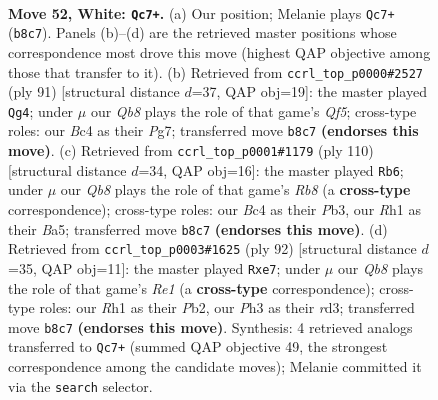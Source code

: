 \documentclass[11pt]{article}
\begin{document}
\clearpage

\begin{figure}[p]\centering
\begin{subfigure}{0.46\textwidth}\centering
\resizebox{\linewidth}{!}{%
\newchessgame
\chessboard[
  setfen={1Q3r2/1b2k3/8/8/2B5/7P/1p4P1/6KR w - - 13 52},
  showmover=false,
  pgfstyle=straightmove, color=movearrow, markmove={b8-c7}
]}
\caption{}
\end{subfigure}\hfill
\begin{subfigure}{0.46\textwidth}\centering
\resizebox{\linewidth}{!}{%
\newchessgame
\chessboard[
  setfen={2R5/4k1pp/5p2/3B4/5q1P/8/5R2/5K2 b - - 0 46},
  showmover=false,
  pgfstyle=straightmove, color=movearrow, markmove={f4-g4}
]}
\caption{}
\end{subfigure}
\\[4pt]
\begin{subfigure}{0.46\textwidth}\centering
\resizebox{\linewidth}{!}{%
\newchessgame
\chessboard[
  setfen={1R6/5k2/p1b2p2/B7/8/1P1r1P2/P5K1/8 w - - 3 56},
  showmover=false,
  pgfstyle=straightmove, color=movearrow, markmove={b8-b6}
]}
\caption{}
\end{subfigure}\hfill
\begin{subfigure}{0.46\textwidth}\centering
\resizebox{\linewidth}{!}{%
\newchessgame
\chessboard[
  setfen={6k1/4r3/p4p2/8/B5b1/P2r4/1P6/K3R3 w - - 0 47},
  showmover=false,
  pgfstyle=straightmove, color=movearrow, markmove={e1-e7}
]}
\caption{}
\end{subfigure}
\caption{\textbf{Move 52, White: \texttt{Qc7+}.} (a) Our position; Melanie plays \texttt{Qc7+} (\texttt{b8c7}). Panels (b)--(d) are the retrieved master positions whose correspondence most drove this move (highest QAP objective among those that transfer to it). (b) Retrieved from \texttt{ccrl\_top\_p0000\#2527} (ply 91) [structural distance $d$=37, QAP obj=19]: the master played \texttt{Qg4}; under $\mu$ our \emph{Qb8} plays the role of that game's \emph{Qf5}; cross-type roles: our \emph{B}c4 as their \emph{P}g7; transferred move \texttt{b8c7} \textbf{(endorses this move)}. (c) Retrieved from \texttt{ccrl\_top\_p0001\#1179} (ply 110) [structural distance $d$=34, QAP obj=16]: the master played \texttt{Rb6}; under $\mu$ our \emph{Qb8} plays the role of that game's \emph{Rb8} (a \textbf{cross-type} correspondence); cross-type roles: our \emph{B}c4 as their \emph{P}b3, our \emph{R}h1 as their \emph{B}a5; transferred move \texttt{b8c7} \textbf{(endorses this move)}. (d) Retrieved from \texttt{ccrl\_top\_p0003\#1625} (ply 92) [structural distance $d$=35, QAP obj=11]: the master played \texttt{Rxe7}; under $\mu$ our \emph{Qb8} plays the role of that game's \emph{Re1} (a \textbf{cross-type} correspondence); cross-type roles: our \emph{R}h1 as their \emph{P}b2, our \emph{P}h3 as their \emph{r}d3; transferred move \texttt{b8c7} \textbf{(endorses this move)}. Synthesis: 4 retrieved analogs transferred to \texttt{Qc7+} (summed QAP objective 49, the strongest correspondence among the candidate moves); Melanie committed it via the \texttt{search} selector.}
\label{fig:thought-m102}
\end{figure}
\end{document}
